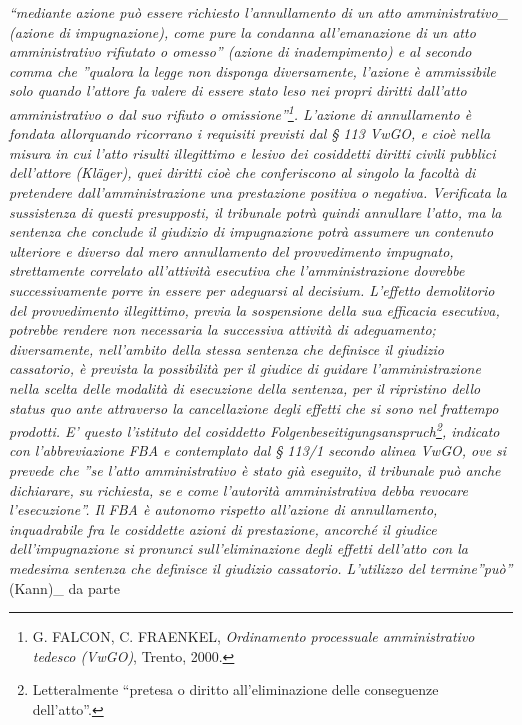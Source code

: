 \documentclass[12pt,it,a4paper,]{report}
\begin{document}
\emph{``mediante azione può essere richiesto l'annullamento di un atto
amministrativo\_ (azione di impugnazione), \emph{come pure la condanna
all'emanazione di un atto amministrativo rifiutato o omesso''} (azione
di inadempimento) e al secondo comma che \emph{''qualora la legge non
disponga diversamente, l'azione è ammissibile solo quando l'attore fa
valere di essere stato leso nei propri diritti dall'atto amministrativo
o dal suo rifiuto o omissione''}\footnote{G. FALCON, C. FRAENKEL,
  \emph{Ordinamento processuale amministrativo tedesco (VwGO)}, Trento,
  2000.}. L'azione di annullamento è fondata allorquando ricorrano i
requisiti previsti dal \emph{§ 113 VwGO}, e cioè nella misura in cui
l'atto risulti illegittimo e lesivo dei cosiddetti diritti civili
pubblici dell'attore \emph{(Kläger)}, quei diritti cioè che conferiscono
al singolo la facoltà di pretendere dall'amministrazione una prestazione
positiva o negativa. Verificata la sussistenza di questi presupposti, il
tribunale potrà quindi annullare l'atto, ma la sentenza che conclude il
giudizio di impugnazione potrà assumere un contenuto ulteriore e diverso
dal mero annullamento del provvedimento impugnato, strettamente
correlato all'attività esecutiva che l'amministrazione dovrebbe
successivamente porre in essere per adeguarsi al \emph{decisium}.
L'effetto demolitorio del provvedimento illegittimo, previa la
sospensione della sua efficacia esecutiva, potrebbe rendere non
necessaria la successiva attività di adeguamento; diversamente,
nell'ambito della stessa sentenza che definisce il giudizio cassatorio,
è prevista la possibilità per il giudice di guidare l'amministrazione
nella scelta delle modalità di esecuzione della sentenza, per il
ripristino dello \emph{status quo ante} attraverso la cancellazione
degli effetti che si sono nel frattempo prodotti. E' questo l'istituto
del cosiddetto \emph{Folgenbeseitigungsanspruch}\footnote{Letteralmente
  ``pretesa o diritto all'eliminazione delle conseguenze dell'atto''.},
indicato con l'abbreviazione \emph{FBA} e contemplato dal \emph{§ 113/1}
secondo alinea \emph{VwGO}, ove si prevede che \emph{''se l'atto
amministrativo è stato già eseguito, il tribunale può anche dichiarare,
su richiesta, se e come l'autorità amministrativa debba revocare
l'esecuzione''}. Il \emph{FBA} è autonomo rispetto all'azione di
annullamento, inquadrabile fra le cosiddette azioni di prestazione,
ancorché il giudice dell'impugnazione si pronunci sull'eliminazione
degli effetti dell'atto con la medesima sentenza che definisce il
giudizio cassatorio. L'utilizzo del termine''può'' }(Kann)\_ da parte
\end{document}
